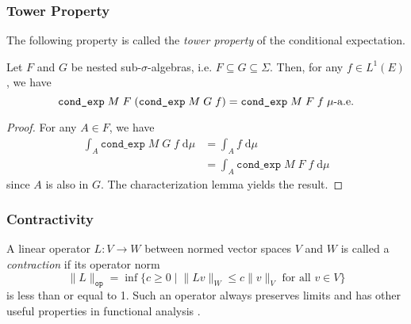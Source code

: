 \subsubsection{Tower Property}

The following property is called the \textit{tower property} of the conditional expectation.

\begin{lemma}
	Let $F$ and $G$ be nested sub-$\sigma$-algebras, i.e. $F \subseteq G \subseteq \Sigma$. Then, for any $f \in L^1(E)$, we have
	\[
		\normalfont \texttt{cond\_exp} \; M \; F \; (\texttt{cond\_exp} \; M \; G \; f) = \texttt{cond\_exp} \; M \; F \; f \; \mu\textrm{-a.e.}
	\]
\end{lemma}
\begin{proof}
	For any $A \in F$, we have
	\begin{align*}
		\int_A \texttt{cond\_exp} \; M \; G \; f \; \textrm{d} \mu &= \int_A f \; \textrm{d} \mu \\
		&= \int_A \texttt{cond\_exp} \; M \; F \; f \; \textrm{d} \mu
	\end{align*}
	since $A$ is also in $G$. The characterization lemma yields the result.
\end{proof}

\subsubsection{Contractivity}

A linear operator $L : V \rightarrow W$ between normed vector spaces $V$ and $W$ is called a \textit{contraction} if its operator norm
\[
	\lVert L \rVert_{\texttt{op}} = \inf\{ c \geq 0 \;\vert\; \lVert Lv \rVert_W \leq c \lVert v \rVert_V \textrm{ for all } v \in V \}
\]
is less than or equal to 1. Such an operator always preserves limits and has other useful properties in functional analysis \cite{sznagy2010}.

